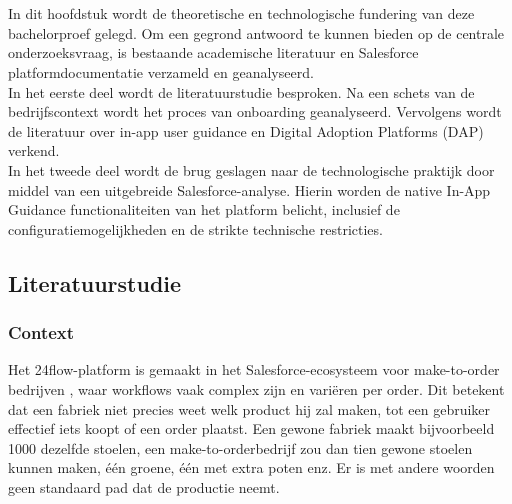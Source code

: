 \chapter{}%
\label{ch:stand-van-zaken}


In dit hoofdstuk wordt de theoretische en technologische fundering van deze bachelorproef gelegd. Om een gegrond antwoord te kunnen bieden op de centrale onderzoeksvraag, is bestaande academische literatuur en Salesforce platformdocumentatie verzameld en geanalyseerd.
\\

In het eerste deel wordt de literatuurstudie besproken. Na een schets van de bedrijfscontext wordt het proces van onboarding geanalyseerd. Vervolgens wordt de literatuur over in-app user guidance en Digital Adoption Platforms (DAP) verkend.
\\

In het tweede deel wordt de brug geslagen naar de technologische praktijk door middel van een uitgebreide Salesforce-analyse. Hierin worden de native In-App Guidance functionaliteiten van het platform belicht, inclusief de configuratiemogelijkheden en de strikte technische restricties.

\section{Literatuurstudie}%
\label{sec:literatuurstudie1}


\subsection{Context}
Het 24flow-platform is gemaakt in het Salesforce-ecosysteem voor make-to-order bedrijven \autocite{Nelfiyanti2025}, waar workflows vaak complex zijn en variëren per order. Dit betekent dat een fabriek niet precies weet welk product hij zal maken, tot een gebruiker effectief iets koopt of een order plaatst. Een gewone fabriek maakt bijvoorbeeld 1000 dezelfde stoelen, een make-to-orderbedrijf zou dan tien gewone stoelen kunnen maken, één groene, één met extra poten enz. Er is met andere woorden geen standaard pad dat de productie neemt. 
\\

